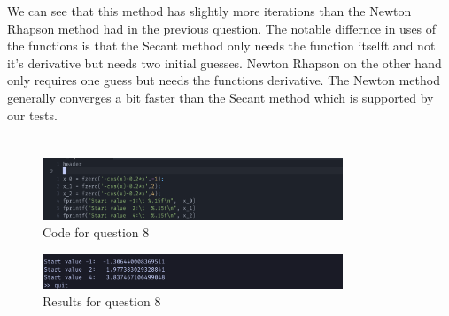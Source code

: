 \documentclass{article}
\begin{document}
We can see that this method has slightly more iterations than the Newton Rhapson method had in the previous question. The notable differnce in uses of the functions is that the Secant method only needs the function itselft and not it's derivative but needs two initial guesses. 
Newton Rhapson on the other hand only requires one guess but needs the functions derivative. The Newton method generally converges a bit faster than the Secant method which is supported by our tests.


\newpage
\section{}

\begin{figure}[H]
	\centering
	\includegraphics[width=0.8\textwidth]{imgs/q8_code.png}
	\caption{Code for question 8}
	\label{fig:q8_code}
\end{figure}

\begin{figure}[H]
	\centering
	\includegraphics[width=0.8\textwidth]{imgs/q8_results.png}
	\caption{Results for question 8}
	\label{fig:q8_result}
\end{figure}
\end{document}
